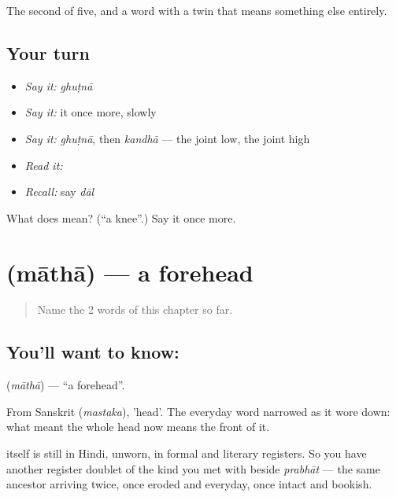 \begin{grammarlens}[title={What you've built}]
The second of five, and a word with a twin that means something else entirely.
\end{grammarlens}

\subsection*{Your turn}
\begin{itemize}
\raggedright
  \item \emph{Say it:} \emph{ghuṭnā}
  \item \emph{Say it:} it once more, slowly
  \item \emph{Say it:} \emph{ghuṭnā}, then \emph{kandhā} — the joint low, the joint high
  \item \emph{Read it:} \textbf{}
  \item \emph{Recall:} say \emph{dāl}
\end{itemize}

\begin{tcolorbox}[breakable,colback=teal!4,colframe=teal!35!black,title={Before you move on}]
What does  mean? (\textquotedblleft{}a knee\textquotedblright{}.) Say it once more.
\end{tcolorbox}
\section[\texorpdfstring{\hi{माथा} (māthā)}{माथा (māthā)}]{ (māthā) — a forehead}

\label{lesson:HI-C53-forehead}



\begin{quote}
Name the 2 words of this chapter so far.
\end{quote}

\subsection*{You'll want to know: }
\textbf{} (\emph{māthā}) — \textquotedblleft{}a forehead\textquotedblright{}.

From Sanskrit  (\emph{mastaka}), 'head'. The everyday word narrowed as it wore down: what meant the whole head now means the front of it.

 itself is still in Hindi, unworn, in formal and literary registers. So you have another register doublet of the kind you met with  beside \emph{prabhāt} — the same ancestor arriving twice, once eroded and everyday, once intact and bookish.

